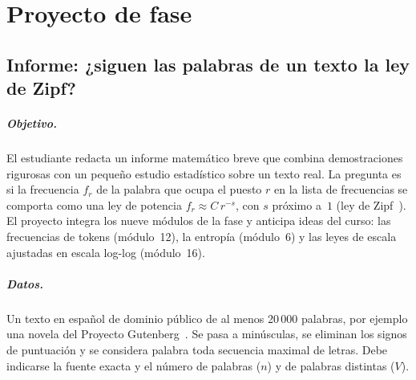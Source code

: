 \chapter{Proyecto de fase}
\label{cap:proyecto}

\section*{Informe: ¿siguen las palabras de un texto la ley de Zipf?}

\paragraph{Objetivo.} El estudiante redacta un informe matemático breve que combina demostraciones rigurosas con un pequeño estudio estadístico sobre un texto real. La pregunta es si la frecuencia $f_r$ de la palabra que ocupa el puesto $r$ en la lista de frecuencias se comporta como una ley de potencia $f_r\approx C\,r^{-s}$, con $s$ próximo a~$1$ (ley de Zipf~\cite{zipf}). El proyecto integra los nueve módulos de la fase y anticipa ideas del curso: las frecuencias de tokens (módulo~12), la entropía (módulo~6) y las leyes de escala ajustadas en escala log-log (módulo~16).

\paragraph{Datos.} Un texto en español de dominio público de al menos 20\,000 palabras, por ejemplo una novela del Proyecto Gutenberg~\cite{gutenberg}. Se pasa a minúsculas, se eliminan los signos de puntuación y se considera palabra toda secuencia maximal de letras. Debe indicarse la fuente exacta y el número de palabras ($n$) y de palabras distintas ($V$).

